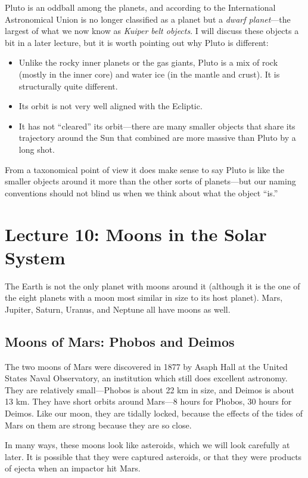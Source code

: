 \documentclass[12pt, preprint]{aastex}
\begin{document}
Pluto is an oddball among the planets, and according to the
International Astronomical Union is no longer classified as a planet
but a {\it dwarf planet}---the largest of what we now know as {\it
  Kuiper belt objects}.  I will discuss these objects a bit in a later
lecture, but it is worth pointing out why Pluto is different:
\begin{itemize}
  \item Unlike the rocky inner planets or the gas giants, Pluto is a
    mix of rock (mostly in the inner core) and water ice (in the
    mantle and crust). It is structurally quite different.
  \item Its orbit is not very well aligned with the Ecliptic.
  \item It has not ``cleared'' its orbit---there are many smaller
    objects that share its trajectory around the Sun that combined are
    more massive than Pluto by a long shot.
\end{itemize}
From a taxonomical point of view it does make sense to say Pluto is
like the smaller objects around it more than the other sorts of
planets---but our naming conventions should not blind us when we think
about what the object ``is.''

\clearpage
\section{Lecture 10: Moons in the Solar System}

The Earth is not the only planet with moons around it (although it is
the one  of the eight planets with a moon most similar in size to its
host planet). Mars, Jupiter, Saturn, Uranus, and Neptune all have
moons as well.

\subsection{Moons of Mars: Phobos and Deimos}

The two moons of Mars were discovered in 1877 by Asaph Hall at the United
States Naval Observatory, an institution which still does excellent
astronomy. They are relatively small---Phobos  is about 22 km in size,
and Deimos is about 13 km. They have short orbits around Mars---8
hours for Phobos, 30 hours for Deimos. Like our moon, they are tidally
locked, because the effects of the tides of Mars on them are strong
because they are so close.

In many ways, these moons look like asteroids, which we will look
carefully at later. It is possible that they were captured asteroids,
or that they were products of ejecta when an impactor hit Mars. 
\end{document}
